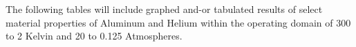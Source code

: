 \appendix
{}
The following tables will include graphed and-or tabulated results of select material properties of Aluminum and Helium within the operating domain of 300 to 2 Kelvin and 20 to 0.125 Atmospheres.
\newpage